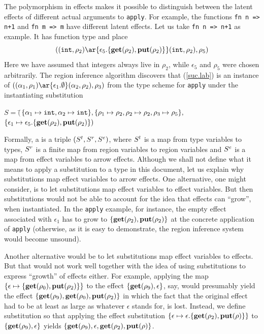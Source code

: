 \documentclass[12pt]{book}
\begin{document}
The polymorphism in effects makes it possible to distinguish between the latent effects of different
actual arguments to {\tt apply}. For example, the functions {\tt fn n => n+1} and {\tt fn m => m}
have different latent effects. Let us take {\tt fn n => n+1} as example. It has function type and place
\begin{equation}
\label{suc.lab}
((\boxml{int},\rho_2)\ar{\epsilon_5.\{\Get(\rho_2),\Put(\rho_2)\}}(\boxml{int}, \rho_2), \rho_5)
\end{equation}
Here we have assumed that integers always live in $\rho_2$, while $\epsilon_5$ and $\rho_5$ were
chosen arbitrarily. The region inference algorithm discovers that (\ref{suc.lab}) is an instance
of $((\alpha_1,\rho_1)
        \ar{\epsilon_1.\emptyset}(\alpha_2,\rho_2),\rho_3)$ from the type scheme for {\tt apply} 
under the instantiating substitution
\begin{tabbing}
$S =($\=$\{\alpha_1\mapsto\hbox{\tt int},\alpha_2\mapsto\hbox{\tt int}\},\{
       \rho_1\mapsto\rho_2,\rho_2\mapsto\rho_2,\rho_3\mapsto\rho_5\},$\\
\>$\{
       \epsilon_1\mapsto\epsilon_5.\{\mathop{\bf get}\nolimits(\rho_2),\mathop{\bf put}\nolimits(\rho_2)\})$
\end{tabbing}
Formally, a  is a triple $(S^t,S^r,S^e)$,
where $S^t$ is a map from type variables to types, $S^r$ is a finite map from region variables
to region variables and $S^e$ is a map from effect variables to arrow effects.
Although we shall not define what it means to apply a  substitution to a
type in this document, 
let us explain why substitutions map effect variables to arrow effects. 
One alternative, one might consider, is to let substitutions map effect variables to effect
variables. But then substitutions would not be able to 
account for the idea that
effects can ``grow'', when instantiated. In the {\tt apply} example, for instance, the
empty effect associated with $\epsilon_1$ has to grow to $\{\mathop{\bf get}\nolimits(\rho_2),\mathop{\bf put}\nolimits(\rho_2)\}$ at the
concrete application of {\tt apply} (otherwise, as it is easy to demonstrate, 
the region inference system would become unsound). 

Another alternative would be to let substitutions
map effect variables to effects. But that would not work well together with the idea of
using substitutions to express ``growth'' of effects either. For example, applying the
map $\{\epsilon\mapsto\{\mathop{\bf get}\nolimits(\rho_0),\mathop{\bf put}\nolimits(\rho_2)\}\}$ to the effect $\{\mathop{\bf get}\nolimits(\rho_9),\epsilon\}$,
say, 
would presumably yield the effect $\{\mathop{\bf get}\nolimits(\rho_9),\mathop{\bf get}\nolimits(\rho_0),\mathop{\bf put}\nolimits(\rho_2)\}$ in which the fact
that the original effect had to be at least as large as whatever $\epsilon$ stands for, is lost.
Instead, we define substitution so that applying the effect substitution
$\{\epsilon\mapsto\epsilon.\{\mathop{\bf get}\nolimits(\rho_2),\mathop{\bf put}\nolimits(\rho)\}\}$ to 
$\{\mathop{\bf get}\nolimits(\rho_9),\epsilon\}$ yields $\{\mathop{\bf get}\nolimits(\rho_9),\epsilon,\mathop{\bf get}\nolimits(\rho_2),\mathop{\bf put}\nolimits(\rho)\}$.
\end{document}
